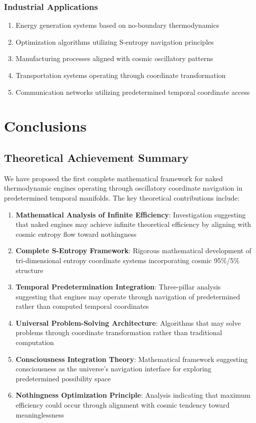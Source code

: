 \documentclass[11pt,a4paper]{article}
\theoremstyle{remark}
\begin{document}
\subsubsection{Industrial Applications}

\begin{enumerate}
\item Energy generation systems based on no-boundary thermodynamics
\item Optimization algorithms utilizing S-entropy navigation principles
\item Manufacturing processes aligned with cosmic oscillatory patterns
\item Transportation systems operating through coordinate transformation
\item Communication networks utilizing predetermined temporal coordinate access
\end{enumerate}

\section{Conclusions}

\subsection{Theoretical Achievement Summary}

We have proposed the first complete mathematical framework for naked thermodynamic engines operating through oscillatory coordinate navigation in predetermined temporal manifolds. The key theoretical contributions include:

\begin{enumerate}
\item \textbf{Mathematical Analysis of Infinite Efficiency}: Investigation suggesting that naked engines may achieve infinite theoretical efficiency by aligning with cosmic entropy flow toward nothingness
\item \textbf{Complete S-Entropy Framework}: Rigorous mathematical development of tri-dimensional entropy coordinate systems incorporating cosmic 95\%/5\% structure
\item \textbf{Temporal Predetermination Integration}: Three-pillar analysis suggesting that engines may operate through navigation of predetermined rather than computed temporal coordinates
\item \textbf{Universal Problem-Solving Architecture}: Algorithms that may solve problems through coordinate transformation rather than traditional computation
\item \textbf{Consciousness Integration Theory}: Mathematical framework suggesting consciousness as the universe's navigation interface for exploring predetermined possibility space
\item \textbf{Nothingness Optimization Principle}: Analysis indicating that maximum efficiency could occur through alignment with cosmic tendency toward meaninglessness
\end{enumerate}
\end{document}
